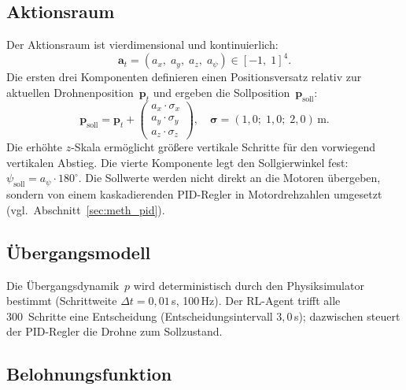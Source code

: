 \subsection{Aktionsraum}
\label{subsec:meth_aktionsraum}

Der Aktionsraum ist vierdimensional und kontinuierlich:
\begin{equation} \label{eq:meth_action}
  \mathbf{a}_t = (a_x,\; a_y,\; a_z,\; a_\psi) \in [-1,\; 1]^4.
\end{equation}
Die ersten drei Komponenten definieren einen Positionsversatz relativ zur
aktuellen Drohnenposition~$\mathbf{p}_t$ und ergeben die
Sollposition~$\mathbf{p}_{\mathrm{soll}}$:
\begin{equation} \label{eq:meth_target_pos}
  \mathbf{p}_{\mathrm{soll}} = \mathbf{p}_t +
  \begin{pmatrix} a_x \cdot \sigma_x \\ a_y \cdot \sigma_y \\ a_z \cdot \sigma_z \end{pmatrix},
  \quad \boldsymbol{\sigma} = (1{,}0;\; 1{,}0;\; 2{,}0)\,\text{m}.
\end{equation}
Die erhöhte $z$-Skala ermöglicht größere vertikale Schritte für den
vorwiegend vertikalen Abstieg. Die vierte Komponente legt den
Sollgierwinkel fest:
$\psi_{\mathrm{soll}} = a_\psi \cdot 180^{\circ}$.
Die Sollwerte werden nicht direkt an die Motoren übergeben, sondern von
einem kaskadierenden PID-Regler in Motordrehzahlen umgesetzt
(vgl.\ Abschnitt~\ref{sec:meth_pid}).

\subsection{Übergangsmodell}
\label{subsec:meth_uebergangsmodell}

Die Übergangsdynamik~$p$ wird deterministisch durch den Physiksimulator
bestimmt (Schrittweite $\Delta t = 0{,}01$\,s, 100\,Hz). Der RL-Agent
trifft alle 300~Schritte eine Entscheidung (Entscheidungsintervall
$3{,}0$\,s); dazwischen steuert der PID-Regler die Drohne zum Sollzustand.

\subsection{Belohnungsfunktion}
\label{subsec:meth_belohnung}

